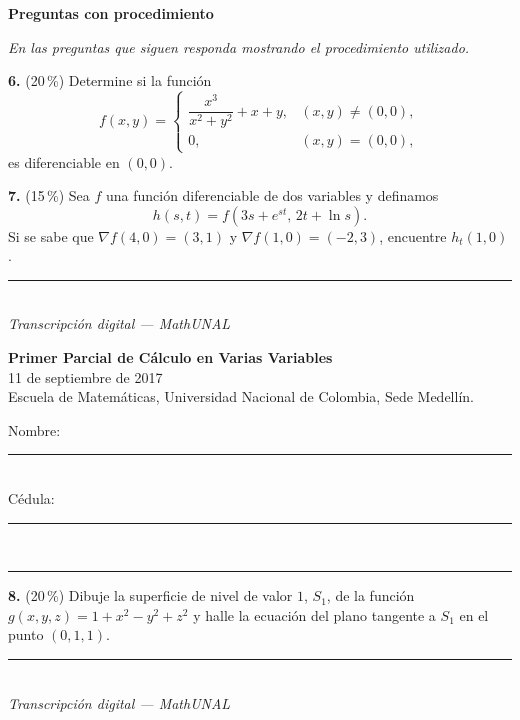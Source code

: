 \documentclass[11pt]{article}
\newcommand{\examheader}{%
  \noindent
  \begin{minipage}[t]{0.62\linewidth}
    {\bfseries\large Primer Parcial de C\'alculo en Varias Variables}\\
    {\small 11 de septiembre de 2017}\\
    {\small Escuela de Matem\'aticas, Universidad Nacional de Colombia, Sede Medell\'in.}
  \end{minipage}%
  \hfill
  \begin{minipage}[t]{0.33\linewidth}
    \raggedleft\small
    Nombre: \rule{2.8cm}{0.4pt}\\[4pt]
    C\'edula: \rule{2.8cm}{0.4pt}
  \end{minipage}\\[4pt]
  \rule{\linewidth}{0.6pt}
}
\newcommand{\examfooter}{%
  \vfill
  \rule{\linewidth}{0.4pt}\\[1pt]
  {\scriptsize\textit{Transcripci\'on digital --- MathUNAL}\hfill\textcolor{unalblue}{\textbf{\thepage}}}
}
\begin{document}
\textbf{Preguntas con procedimiento}

\textit{En las preguntas que siguen responda mostrando el procedimiento utilizado.}

\bigskip
\noindent\textbf{6.} (20\,\%) Determine si la funci\'on
$$
f(x,y)=
\begin{cases}
\dfrac{x^3}{x^2+y^2}+x+y, & (x,y)\neq (0,0),\\[6pt]
0, & (x,y)=(0,0),
\end{cases}
$$
es diferenciable en $(0,0)$.

\vspace{4.5cm}

\noindent\textbf{7.} (15\,\%) Sea $f$ una funci\'on diferenciable de dos variables y definamos
$$h(s,t) = f\!\left(3s+e^{st},\, 2t+\ln s\right).$$
Si se sabe que $\nabla f(4,0) = (3,1)$ y $\nabla f(1,0) = (-2,3)$, encuentre $h_t(1,0)$.

\vfill
\examfooter
\newpage
\examheader
\vspace{2pt}

\noindent\textbf{8.} (20\,\%) Dibuje la superficie de nivel de valor $1$, $S_1$, de la funci\'on $g(x,y,z)=1+x^2-y^2+z^2$ y halle la ecuaci\'on del plano tangente a $S_1$ en el punto $(0,1,1)$.

\vfill
\examfooter
\end{document}
